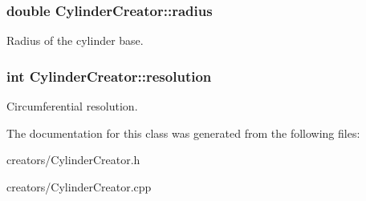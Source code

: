 \subsubsection[{\texorpdfstring{radius}{radius}}]{\setlength{\rightskip}{0pt plus 5cm}double Cylinder\+Creator\+::radius\hspace{0.3cm}{\ttfamily [private]}}\hypertarget{class_cylinder_creator_a3558e3005e9567532b04a8f1d32ff4a4}{}\label{class_cylinder_creator_a3558e3005e9567532b04a8f1d32ff4a4}
Radius of the cylinder base. 
\subsubsection[{\texorpdfstring{resolution}{resolution}}]{\setlength{\rightskip}{0pt plus 5cm}int Cylinder\+Creator\+::resolution\hspace{0.3cm}{\ttfamily [private]}}\hypertarget{class_cylinder_creator_a9bb62db1072cadf1cce2962c7b954b9b}{}\label{class_cylinder_creator_a9bb62db1072cadf1cce2962c7b954b9b}
Circumferential resolution. 

The documentation for this class was generated from the following files\+:\begin{DoxyCompactItemize}
\item 
creators/Cylinder\+Creator.\+h\item 
creators/Cylinder\+Creator.\+cpp\end{DoxyCompactItemize}

